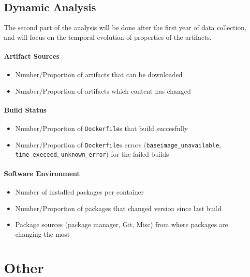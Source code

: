 \documentclass{article}
\newcommand{\dfile}{\texttt{Dockerfile}}
\begin{document}
\subsection{Dynamic Analysis}

The second part of the analysis will be done after the first year of data collection, and will focus on the temporal evolution of properties of the artifacts.

\paragraph{Artifact Sources}

\begin{itemize}
\item Number/Proportion of artifacts that can be downloaded
\item Number/Proportion of artifacts which content has changed
\end{itemize}

\paragraph{Build Status}

\begin{itemize}
\item Number/Proportion of \dfile s that build succesfully
\item Number/Proportion of \dfile s errors (\texttt{baseimage\_unavailable}, \texttt{time\_execeed}, \texttt{unknown\_error}) for the failed builds
\end{itemize}

\paragraph{Software Environment}

\begin{itemize}
\item Number of installed packages per container
\item Number/Proportion of packages that changed version since last build
\item Package sources (package manager, Git, Misc) from where packages are changing the most
\end{itemize}

\section{Other}
\end{document}
